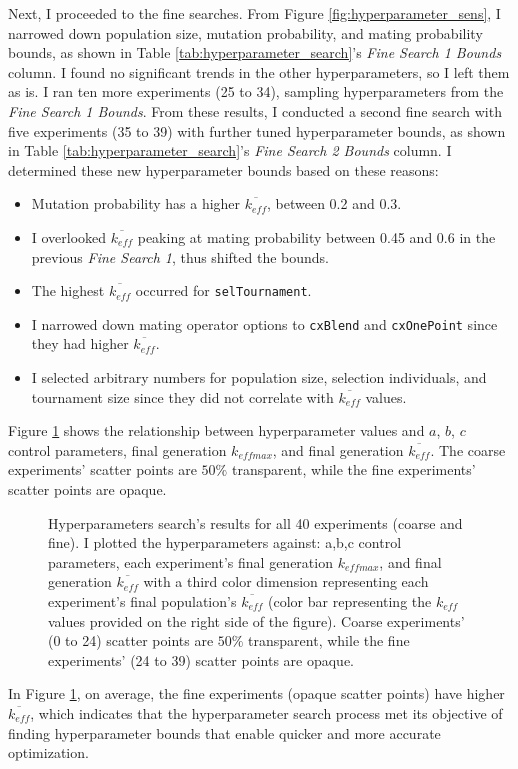 Next, I proceeded to the fine searches. 
From Figure \ref{fig:hyperparameter_sens}, I narrowed down population size, 
mutation probability, and mating probability bounds, as shown in Table 
\ref{tab:hyperparameter_search}'s \textit{Fine Search 1 Bounds} column. 
I found no significant trends in the other hyperparameters, so I left them 
as is. 
I ran ten more experiments (25 to 34), sampling hyperparameters from 
the \textit{Fine Search 1 Bounds}. 
From these results, I conducted a second fine search with five experiments 
(35 to 39) with further tuned hyperparameter bounds, as shown in Table 
\ref{tab:hyperparameter_search}'s \textit{Fine Search 2 Bounds} column. 
I determined these new hyperparameter bounds based on these reasons: 
\begin{itemize}
    \item Mutation probability has a higher $\overline{k_{eff}}$, between 0.2 and 0.3.
    \item I overlooked $\overline{k_{eff}}$  peaking at mating probability between 
    0.45 and 0.6 in the previous \textit{Fine Search 1}, thus shifted the bounds. 
    \item The highest $\overline{k_{eff}}$ occurred for \texttt{selTournament}. 
    \item I narrowed down mating operator options to \texttt{cxBlend} and 
    \texttt{cxOnePoint} since they had higher $\overline{k_{eff}}$. 
    \item I selected arbitrary numbers for population size, 
    selection individuals, and tournament size since they did not 
    correlate with $\overline{k_{eff}}$ values. 
\end{itemize}
Figure \ref{fig:input_hyperparameters_sens} shows the relationship between 
hyperparameter values and $a$, $b$, $c$ control parameters, final generation 
$k_{eff max}$, and final generation $\overline{k_{eff}}$. 
The coarse experiments' scatter points are $50\%$ transparent, while the fine 
experiments' scatter points are opaque. 
\begin{figure}[]
    \centering
    \caption{Hyperparameters search's results for all 40 experiments (coarse 
    and fine). I plotted the hyperparameters against: a,b,c control parameters, 
    each experiment's final generation $k_{eff max}$, and final generation 
    $\overline{k_{eff}}$ with a third color dimension representing each experiment's final 
    population's $\overline{k_{eff}}$ (color bar representing the $k_{eff}$ values 
    provided on the right side of the figure). Coarse experiments' (0 to 24) scatter points 
    are $50\%$ transparent, while the fine experiments' (24 to 39) scatter points 
    are opaque. }
    \label{fig:input_hyperparameters_sens}
\end{figure}
In Figure \ref{fig:input_hyperparameters_sens}, on average, the fine experiments 
(opaque scatter points) have higher $\overline{k_{eff}}$, which indicates that the
hyperparameter search process met its objective of finding hyperparameter 
bounds that enable quicker and more accurate optimization. 

